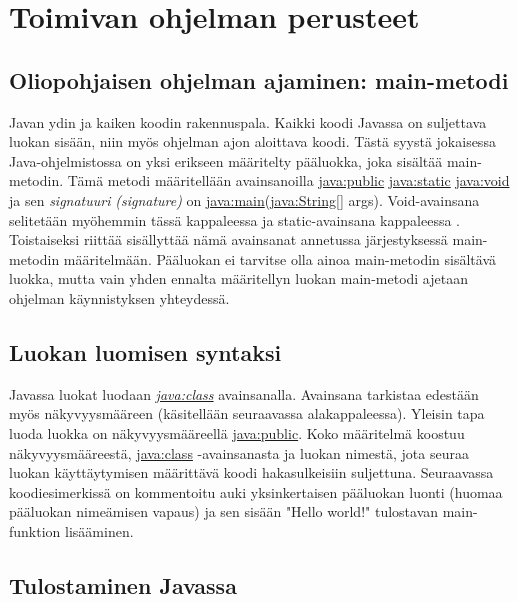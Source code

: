 \documentclass{tufte-book}
\newcommand{\eng}[1]{\textit{(#1)}}
\newcommand{\new}[1]{\textit{\gls{#1}}}
\newcommand{\neweng}[2]{\new{#1} \eng{#2}}
\newcommand{\java}[1]{\underline{\gls{java:#1}}}
\newcommand{\newjava}[1]{\textit{\java{#1}}}
\begin{document}
\section{Toimivan ohjelman perusteet}
\label{ohjelman perusteista}

\subsection{Oliopohjaisen ohjelman ajaminen: main-metodi}
\label{main}

 Javan ydin ja kaiken koodin rakennuspala. Kaikki koodi Javassa on
suljettava luokan sisään, niin myös ohjelman ajon aloittava koodi. Tästä syystä jokaisessa
Java-ohjelmistossa on yksi erikseen määritelty pääluokka, joka sisältää main-metodin. Tämä
metodi määritellään avainsanoilla \java{public} \java{static} \java{void} ja sen 
\neweng{signatuuri}{signature} on \java{main}(\java{String}[] args). Void-avainsana selitetään
myöhemmin tässä kappaleessa ja static-avainsana kappaleessa .
Toistaiseksi riittää sisällyttää nämä avainsanat annetussa järjestyksessä main-metodin
määritelmään. Pääluokan ei tarvitse olla ainoa main-metodin sisältävä luokka, mutta vain yhden
ennalta määritellyn luokan main-metodi ajetaan ohjelman käynnistyksen yhteydessä.

\subsection{Luokan luomisen syntaksi}
\label{luokka}

 Javassa luokat luodaan \newjava{class} avainsanalla. Avainsana
tarkistaa edestään myös näkyvyysmääreen (käsitellään seuraavassa alakappaleessa). Yleisin tapa
luoda luokka on näkyvyysmääreellä \java{public}. Koko määritelmä koostuu näkyvyysmääreestä,
\java{class} -avainsanasta ja luokan nimestä, jota seuraa luokan käyttäytymisen määrittävä koodi
hakasulkeisiin suljettuna. Seuraavassa koodiesimerkissä on kommentoitu auki yksinkertaisen
pääluokan luonti (huomaa pääluokan nimeämisen vapaus) ja sen sisään "Hello world!" tulostavan
main-funktion lisääminen.

\subsection{Tulostaminen Javassa}
\label{print}
\end{document}
